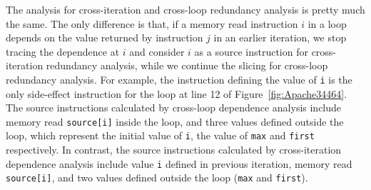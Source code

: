 
The analysis for cross-iteration and cross-loop redundancy analysis is pretty
much the same. The only difference is that, if a memory read instruction 
$i$ in a loop depends on the value returned by instruction $j$ in an earlier
iteration, we stop tracing the dependence at $i$ and consider $i$ as a
source instruction for cross-iteration redundancy analysis, while we continue
the slicing for cross-loop redundancy analysis. 
For example, 
the instruction defining the value of \texttt{i} is the only side-effect instruction 
for the loop at line 12 of Figure~\ref{fig:Apache34464}. 
The source instructions calculated by cross-loop dependence analysis include 
memory read \texttt{source[i]} inside the loop, 
and three values defined outside the loop, 
which represent the initial value of \texttt{i}, the value of \texttt{max} and \texttt{first} respectively. 
In contrast, 
the source instructions calculated by cross-iteration dependence analysis 
include value \texttt{i} defined in previous iteration, 
memory read \texttt{source[i]}, 
and two values defined outside the loop (\texttt{max} and \texttt{first}).  


